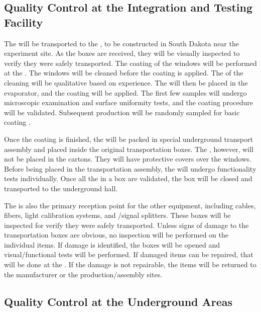 \subsection{Quality Control at the Integration and Testing Facility}

The  will be transported to the , to be constructed in South Dakota near the experiment site. As the  boxes are received, they will be visually inspected to verify they were safely transported. The  coating of the  windows will be performed at the . The  windows will be cleaned before the coating is applied. The  of the cleaning will be qualitative based on experience. The  will then be placed in the evaporator, and the coating will be applied. The first few samples will undergo microscopic examination and surface uniformity tests, and the coating procedure will be validated. Subsequent production  will be randomly sampled for basic coating .

Once the coating is finished, the  will be packed in special underground transport assembly and placed inside the original transportation boxes. The , however, will not be placed in the cartons. They will have protective covers over the windows. Before being placed in the transportation assembly, the  will undergo functionality tests individually. Once all the  in a box are validated, the box will be closed and transported to the underground hall.

The  is also the primary reception point for the other   equipment, including cables, fibers, light calibration systems, and /signal splitters. These boxes will be inspected for verify they were safely transported. Unless signs of  damage to the transportation boxes are obvious, no  inspection will be performed on the individual items. If  damage is identified, the boxes will be opened and visual/functional  tests will be performed. If damaged items can be repaired, that will be done at the . If the damage is not repairable, the items will be returned to the manufacturer or the production/assembly sites.

\subsection{Quality Control at the Underground Areas}

